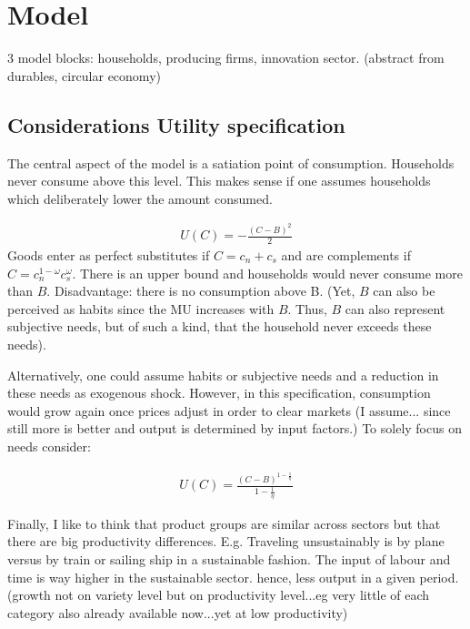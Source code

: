 \section{Model}

3 model blocks: households, producing firms, innovation sector.
(abstract from durables, circular economy) %


\subsection{Considerations Utility specification}
The central aspect of the model is a satiation point of consumption. Households never consume above this level. This makes sense if one assumes households which deliberately lower the amount consumed. 

\begin{align*}
U(C)= -\frac{(C-B)^2}{2} 
\end{align*}
Goods enter as perfect substitutes if $C=c_n+c_s$ and are complements if $C=c_n^{1-\omega}c_s^\omega$.
 There is an upper bound and households would never consume more than $B$. Disadvantage: there is no consumption above B.  (Yet, $B$ can also be perceived as habits since the MU increases with $B$. Thus, $B$ can also represent subjective needs, but of such a kind, that the household never exceeds these needs). 


Alternatively, one could assume habits or subjective needs and a reduction in these needs as exogenous shock. However, in this specification, consumption would grow again once prices adjust in order to clear markets (I assume... since still more is better and output is determined by input factors.)
To solely focus on needs consider:

\begin{align*}
	U(C)= \frac{(C-B)^{1-\frac{1}{\eta}}}{1-\frac{1}{\eta}}
\end{align*}


Finally, I like to think that product groups are similar across sectors but that there are big productivity differences. E.g. Traveling unsustainably is by plane versus by train or sailing ship in a sustainable fashion. The input of labour and time is way higher in the sustainable sector. hence, less output in a given period. (growth not on variety level but on productivity level...eg very little of each category also already available now...yet at low productivity)


